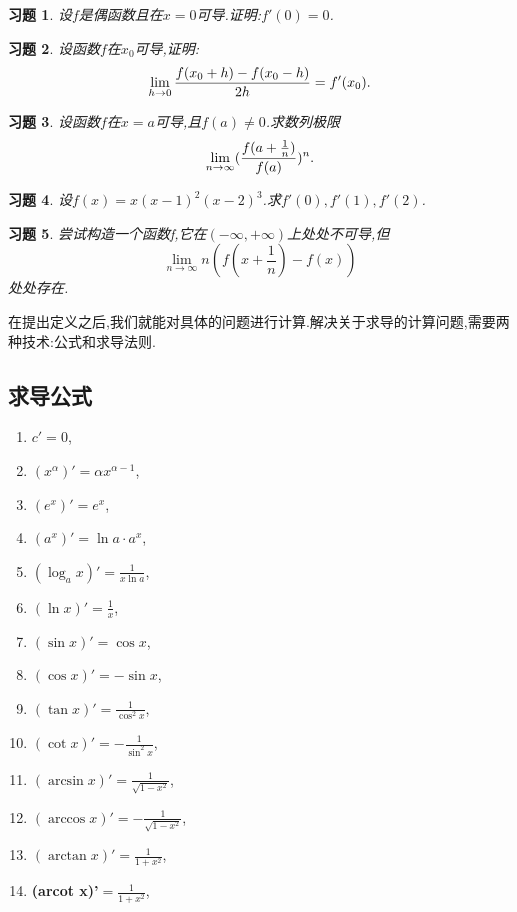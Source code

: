 \documentclass{article}
\newtheorem{exer}{习题}[subsection]
\begin{document}
\begin{exer}
    设$f$是偶函数且在$x=0$可导.证明:$f'(0)=0$.\\
\end{exer}
\vspace*{100pt}

\begin{exer}
    设函数$f$在$x_0$可导,证明:
    $$
    \lim_{h\to 0}\frac{f(x_0+h)-f(x_0-h)}{2h}=f'(x_0).\\
    $$
\end{exer}
\newpage


\begin{exer}
    设函数$f$在$x=a$可导,且$f(a)\neq 0$.求数列极限
    $$
    \lim_{n\to\infty}(\frac{f(a+\frac1n)}{f(a)})^n.\\
    $$
\end{exer}
\vspace*{100pt}



\begin{exer}
    设$f(x)=x(x-1)^2(x-2)^3$.求$f'(0),f'(1),f'(2)$.\\
\end{exer}
\vspace*{120pt}


\begin{exer}
    尝试构造一个函数f,它在$(-\infty,+\infty)$上处处不可导,但
    $$
    \lim_{n\to \infty}n(f(x+\frac1n)-f(x))
    $$
    处处存在.\\
\end{exer}
\vspace*{80pt}

\newpage


\noindent 在提出定义之后,我们就能对具体的问题进行计算.解决关于求导的计算问题,需要两种技术:公式和求导法则.

\subsection{求导公式}

\begin{enumerate}
    \item $c'=0$,
    \item $(x^{\alpha})'=\alpha x^{\alpha-1}$,
    \item $(e^x)'=e^x$,
    \item $(a^x)'=\ln a \cdot a^x$,
    \item $(\log_ax)'=\frac1{x\ln a}$,
    \item $(\ln x)'=\frac1x$,
    \item $(\sin x)'=\cos x$,
    \item $(\cos x)'=-\sin x$,
    \item $(\tan x)'=\frac1{\cos^2 x}$,
    \item $(\cot x)'=-\frac1{\sin^2 x}$,
    \item $(\arcsin x)'=\frac1{\sqrt{1-x^2}}$,
    \item $(\arccos x)'=-\frac1{\sqrt{1-x^2}}$,
    \item $(\arctan x)'=\frac1{1+x^2}$,
    \item \textbf{(arcot x)'}$=\frac1{1+x^2}$,

\end{enumerate}
\end{document}
